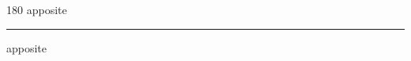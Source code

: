 
\begin{frame}
\begin{center}
\begin{turn}{180}
{\fontsize{2.5cm}{1em}\selectfont apposite}
\end{turn}
\vspace{1em}\par  
\hrule
\vspace{1em}\par  
{\fontsize{2.5cm}{1em}\selectfont apposite}
\end{center}
\end{frame}
